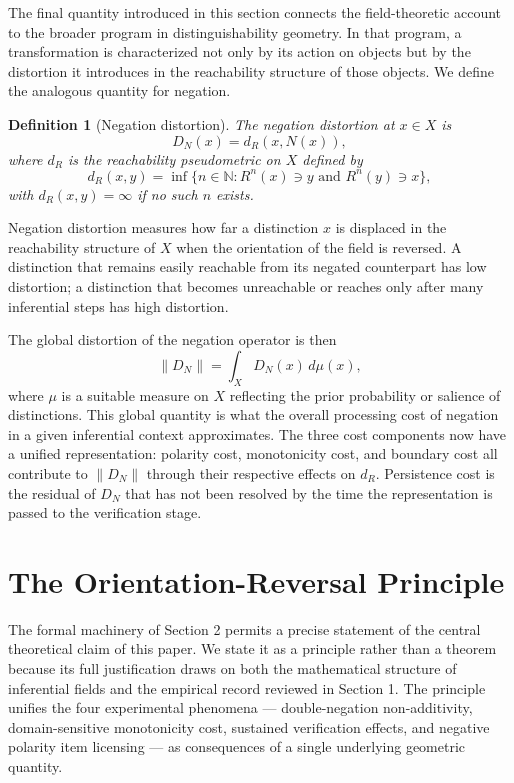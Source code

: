 \documentclass[12pt]{article}
\newtheorem{definition}[theorem]{Definition}
\theoremstyle{remark}
\begin{document}
The final quantity introduced in this section connects the field-theoretic
account to the broader program in distinguishability geometry. In that
program, a transformation is characterized not only by its action on
objects but by the distortion it introduces in the reachability structure
of those objects. We define the analogous quantity for negation.

\begin{definition}[Negation distortion]
The \emph{negation distortion} at $x \in X$ is
\[
D_N(x) = d_R(x, N(x)),
\]
where $d_R$ is the reachability pseudometric on $X$ defined by
\[
d_R(x, y) = \inf \{ n \in \mathbb{N} : R^n(x) \ni y \text{ and }
R^n(y) \ni x \},
\]
with $d_R(x,y) = \infty$ if no such $n$ exists.
\end{definition}
Negation distortion measures how far a distinction $x$ is displaced in
the reachability structure of $X$ when the orientation of the field is
reversed. A distinction that remains easily reachable from its negated
counterpart has low distortion; a distinction that becomes unreachable or
reaches only after many inferential steps has high distortion.

The global distortion of the negation operator is then
\[
\|D_N\| = \int_X D_N(x)\, d\mu(x),
\]
where $\mu$ is a suitable measure on $X$ reflecting the prior probability
or salience of distinctions. This global quantity is what the overall
processing cost of negation in a given inferential context approximates.
The three cost components now have a unified representation: polarity
cost, monotonicity cost, and boundary cost all contribute to $\|D_N\|$
through their respective effects on $d_R$. Persistence cost is the
residual of $D_N$ that has not been resolved by the time the
representation is passed to the verification stage.

\section{The Orientation-Reversal Principle}

The formal machinery of Section 2 permits a precise statement of the
central theoretical claim of this paper. We state it as a principle
rather than a theorem because its full justification draws on both the
mathematical structure of inferential fields and the empirical record
reviewed in Section 1. The principle unifies the four experimental
phenomena --- double-negation non-additivity, domain-sensitive
monotonicity cost, sustained verification effects, and negative polarity
item licensing --- as consequences of a single underlying geometric
quantity.
\end{document}

